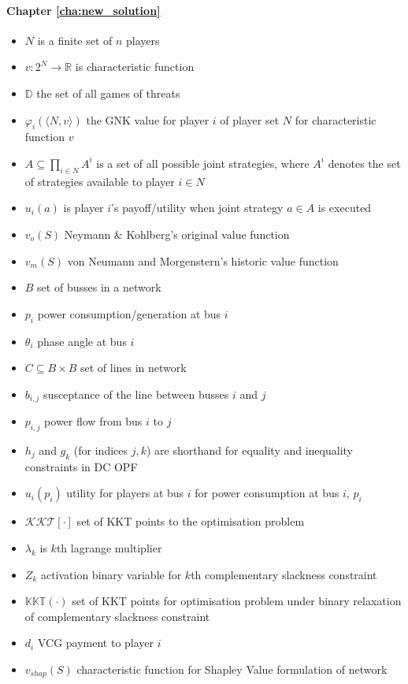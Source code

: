 \paragraph{Chapter \ref{cha:new_solution}}
\begin{itemize}
\item	$N$ is a finite set of $n$ players
\item	$v:2^N\rightarrow \mathbb{R}$ is characteristic function
\item	$\mathbb{D}$ the set of all games of threats
\item	$\varphi_i(\langle N,v\rangle)$ the GNK value for player $i$ of player set $N$ for characteristic function $v$
\item	$A\subseteq \prod_{i\in N}A^i$ is a set of all possible joint strategies, where $A^i$ denotes the set of strategies available to player $i\in N$
\item	$u_i(a)$ is player $i$'s payoff/utility when joint strategy $a\in A$ is executed
\item	$v_o(S)$ Neymann \& Kohlberg's original value function
\item	$v_m(S)$ von Neumann and Morgenstern's historic value function
\item	$B$ set of busses in a network
\item	$p_i$ power consumption/generation at bus $i$
\item	$\theta_i$ phase angle at bus $i$
\item	$C\subseteq B\times B$ set of lines in network
\item	$b_{i,j}$ susceptance of the line between busses $i$ and $j$
\item	$p_{i,j}$ power flow from bus $i$ to $j$
\item	$h_j$ and $g_k$ (for indices $j,k$) are shorthand for equality and inequality constraints in DC OPF
\item	$u_i(p_i)$ utility for players at bus $i$ for power consumption at bus $i$, $p_i$
\item	$\mathcal{KKT}[\cdot]$ set of KKT points to the optimisation problem
\item	$\lambda_k$ is $k$th lagrange multiplier
\item	$Z_k$ activation binary variable for $k$th complementary slackness constraint
\item	$\mathbb{KKT}(\cdot)$ set of KKT points for optimisation problem under binary relaxation of complementary slackness constraint
\item	$d_i$ VCG payment to player $i$
\item	$v_{shap}(S)$ characteristic function for Shapley Value formulation of network 
\end{itemize}

